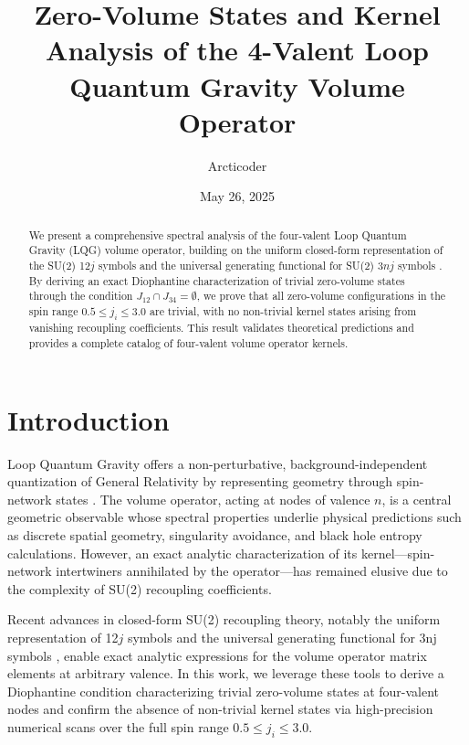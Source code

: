 \documentclass{article}
\begin{document}
\title{Zero-Volume States and Kernel Analysis of the 4-Valent Loop Quantum Gravity Volume Operator}
\author{Arcticoder}
\date{May 26, 2025}
\maketitle

\begin{abstract}
We present a comprehensive spectral analysis of the four-valent Loop Quantum Gravity (LQG) volume operator, building on the uniform closed-form representation of the SU(2) 12$j$ symbols \cite{Arcticoder2025Uniform12j} and the universal generating functional for SU(2) $3nj$ symbols \cite{Arcticoder2025Generating}. By deriving an exact Diophantine characterization of trivial zero-volume states through the condition $J_{12}\cap J_{34}=\emptyset$, we prove that all zero-volume configurations in the spin range $0.5\le j_i\le3.0$ are trivial, with no non-trivial kernel states arising from vanishing recoupling coefficients. This result validates theoretical predictions and provides a complete catalog of four-valent volume operator kernels.
\end{abstract}

\section{Introduction}
Loop Quantum Gravity offers a non-perturbative, background-independent quantization of General Relativity by representing geometry through spin-network states \cite{AshtekarLewandowski2004}. The volume operator, acting at nodes of valence $n$, is a central geometric observable whose spectral properties underlie physical predictions such as discrete spatial geometry, singularity avoidance, and black hole entropy calculations. However, an exact analytic characterization of its kernel—spin-network intertwiners annihilated by the operator—has remained elusive due to the complexity of SU(2) recoupling coefficients.

Recent advances in closed-form SU(2) recoupling theory, notably the uniform representation of 12$j$ symbols \cite{Arcticoder2025Uniform12j} and the universal generating functional for 3nj symbols \cite{Arcticoder2025Generating}, enable exact analytic expressions for the volume operator matrix elements at arbitrary valence. In this work, we leverage these tools to derive a Diophantine condition characterizing trivial zero-volume states at four-valent nodes and confirm the absence of non-trivial kernel states via high-precision numerical scans over the full spin range $0.5\le j_i\le3.0$.
\end{document}
